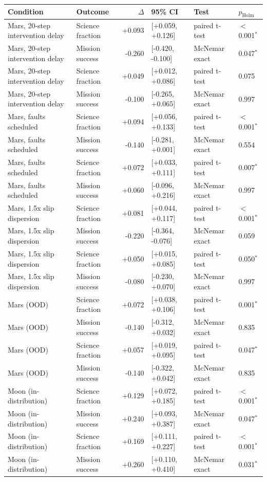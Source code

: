 \begin{tabular}{@{}llr@{~}lll@{}}
\toprule
Condition & Outcome & $\Delta$ & 95\% CI & Test & $p_{\mathrm{Holm}}$ \\
\midrule
Mars, 20-step intervention delay & Science fraction & +0.093 & [+0.059, +0.126] & paired t-test & $<$0.001$^{*}$ \\
Mars, 20-step intervention delay & Mission success & -0.260 & [-0.420, -0.100] & McNemar exact & 0.047$^{*}$ \\
Mars, 20-step intervention delay & Science fraction & +0.049 & [+0.012, +0.086] & paired t-test & 0.075 \\
Mars, 20-step intervention delay & Mission success & -0.100 & [-0.265, +0.065] & McNemar exact & 0.997 \\
Mars, faults scheduled & Science fraction & +0.094 & [+0.056, +0.133] & paired t-test & $<$0.001$^{*}$ \\
Mars, faults scheduled & Mission success & -0.140 & [-0.281, +0.001] & McNemar exact & 0.554 \\
Mars, faults scheduled & Science fraction & +0.072 & [+0.033, +0.111] & paired t-test & 0.007$^{*}$ \\
Mars, faults scheduled & Mission success & +0.060 & [-0.096, +0.216] & McNemar exact & 0.997 \\
Mars, 1.5x slip dispersion & Science fraction & +0.081 & [+0.044, +0.117] & paired t-test & $<$0.001$^{*}$ \\
Mars, 1.5x slip dispersion & Mission success & -0.220 & [-0.364, -0.076] & McNemar exact & 0.059 \\
Mars, 1.5x slip dispersion & Science fraction & +0.050 & [+0.015, +0.085] & paired t-test & 0.050$^{*}$ \\
Mars, 1.5x slip dispersion & Mission success & -0.080 & [-0.230, +0.070] & McNemar exact & 0.997 \\
Mars (OOD) & Science fraction & +0.072 & [+0.038, +0.106] & paired t-test & 0.001$^{*}$ \\
Mars (OOD) & Mission success & -0.140 & [-0.312, +0.032] & McNemar exact & 0.835 \\
Mars (OOD) & Science fraction & +0.057 & [+0.019, +0.095] & paired t-test & 0.047$^{*}$ \\
Mars (OOD) & Mission success & -0.140 & [-0.322, +0.042] & McNemar exact & 0.835 \\
Moon (in-distribution) & Science fraction & +0.129 & [+0.072, +0.185] & paired t-test & $<$0.001$^{*}$ \\
Moon (in-distribution) & Mission success & +0.240 & [+0.093, +0.387] & McNemar exact & 0.047$^{*}$ \\
Moon (in-distribution) & Science fraction & +0.169 & [+0.111, +0.227] & paired t-test & $<$0.001$^{*}$ \\
Moon (in-distribution) & Mission success & +0.260 & [+0.110, +0.410] & McNemar exact & 0.031$^{*}$ \\
\bottomrule
\end{tabular}
